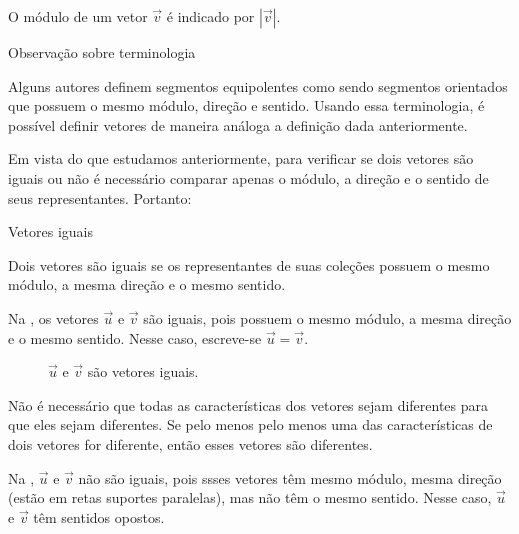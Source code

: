 O módulo de um vetor \(\vec{v}\) é indicado por \(|\vec{v}|\).

\begin{observationtitle}{Observação sobre terminologia}

Alguns autores definem segmentos equipolentes como sendo segmentos orientados que possuem o mesmo módulo, direção e sentido. Usando essa terminologia, é possível definir vetores de maneira análoga a definição dada anteriormente.
\end{observationtitle}



Em vista do que estudamos anteriormente, para verificar se dois vetores são iguais ou não é necessário comparar apenas o módulo, a direção e o sentido de seus representantes. Portanto:

\begin{observationtitle}{Vetores iguais}

Dois vetores são iguais se os representantes de suas coleções possuem o mesmo módulo, a mesma direção e o mesmo sentido.
\end{observationtitle}
\clearmargin

Na , os vetores \(\vec{u}\) e \(\vec{v}\) são iguais, pois possuem o mesmo módulo, a mesma direção e o mesmo sentido. Nesse caso, escreve-se \(\vec{u}=\vec{v}\).
\begin{figure}[H]
\centering
{} 
 \caption{$\vec{u}$ e $\vec{v}$ são vetores iguais.} \label{fig-geometria-operacoesvetores-05} 
 \end{figure}
Não é necessário que todas as características dos vetores sejam diferentes para que eles sejam diferentes. Se pelo menos pelo menos uma das  características de dois vetores for diferente, então esses vetores são diferentes.

Na , \(\vec{u}\) e \(\vec{v}\) não são iguais, pois ssses vetores têm mesmo módulo, mesma direção (estão em retas suportes paralelas), mas não têm o mesmo sentido. Nesse caso, \(\vec{u}\) e \(\vec{v}\) têm sentidos opostos.

